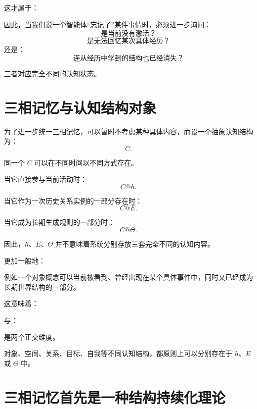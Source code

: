 这才属于：
\begin{statementbox}
\centering
{}
\end{statementbox}

因此，当我们说一个智能体“忘记了”某件事情时，必须进一步询问：
\[
\text{是当前没有激活？}
\]
\[
\text{是无法回忆某次具体经历？}
\]
还是：
\[
\text{连从经历中学到的结构也已经消失？}
\]

三者对应完全不同的认知状态。

\section{三相记忆与认知结构对象}

为了进一步统一三相记忆，可以暂时不考虑某种具体内容，而设一个抽象认知结构为：
\[
C.
\]

同一个 $C$ 可以在不同时间以不同方式存在。

当它直接参与当前活动时：
\[
C@h.
\]

当它作为一次历史关系实例的一部分存在时：
\[
C@E.
\]

当它成为长期生成规则的一部分时：
\[
C@\Theta.
\]

因此，$h$、$E$、$\Theta$ 并不意味着系统分别存放三套完全不同的认知内容。

更加一般地：
\begin{statementbox}
\centering
{}
\end{statementbox}

例如一个对象概念可以当前被看到、曾经出现在某个具体事件中，同时又已经成为长期世界结构的一部分。

这意味着：
\begin{statementbox}
\centering
{}
\end{statementbox}
与：
\begin{statementbox}
\centering
{}
\end{statementbox}
是两个正交维度。

对象、空间、关系、目标、自我等不同认知结构，都原则上可以分别存在于 $h$、$E$ 或 $\Theta$ 中。

\section{三相记忆首先是一种结构持续化理论}

